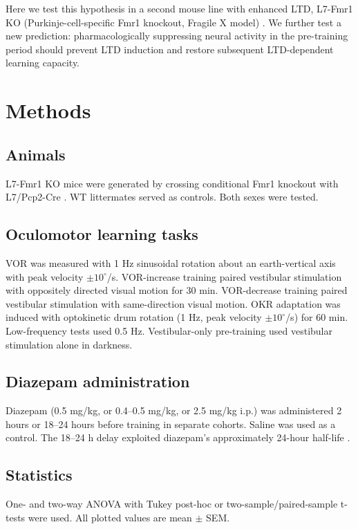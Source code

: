 \documentclass[11pt]{article}
\begin{document}
Here we test this hypothesis in a second mouse line with enhanced LTD, L7-Fmr1 KO (Purkinje-cell-specific Fmr1 knockout, Fragile X model) \cite{koekkoek2005deletion,mientjes2006conditional,zhang2004l7cre}. We further test a new prediction: pharmacologically suppressing neural activity in the pre-training period should prevent LTD induction and restore subsequent LTD-dependent learning capacity.

\section{Methods}
\subsection{Animals}
L7-Fmr1 KO mice were generated by crossing conditional Fmr1 knockout \cite{mientjes2006conditional} with L7/Pcp2-Cre \cite{zhang2004l7cre}. WT littermates served as controls. Both sexes were tested.

\subsection{Oculomotor learning tasks}
VOR was measured with 1 Hz sinusoidal rotation about an earth-vertical axis with peak velocity $\pm 10^\circ$/s. VOR-increase training paired vestibular stimulation with oppositely directed visual motion for 30 min. VOR-decrease training paired vestibular stimulation with same-direction visual motion. OKR adaptation was induced with optokinetic drum rotation (1 Hz, peak velocity $\pm 10^\circ$/s) for 60 min. Low-frequency tests used 0.5 Hz. Vestibular-only pre-training used vestibular stimulation alone in darkness.

\subsection{Diazepam administration}
Diazepam (0.5 mg/kg, or 0.4--0.5 mg/kg, or 2.5 mg/kg i.p.) was administered 2 hours or 18--24 hours before training in separate cohorts. Saline was used as a control. The 18--24 h delay exploited diazepam's approximately 24-hour half-life \cite{riss2008benzodiazepines}.

\subsection{Statistics}
One- and two-way ANOVA with Tukey post-hoc or two-sample/paired-sample t-tests were used. All plotted values are mean $\pm$ SEM.
\end{document}
